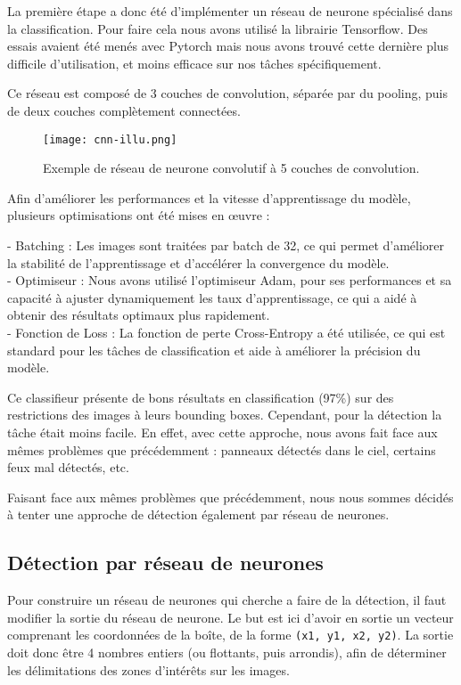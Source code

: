 \documentclass[twocolumn,10pt]{article}
\begin{document}
    La première étape a donc été d'implémenter un réseau de neurone spécialisé dans la classification. Pour faire cela nous avons utilisé la librairie Tensorflow. Des essais avaient été menés avec Pytorch mais nous avons trouvé cette dernière plus difficile d'utilisation, et moins efficace sur nos tâches spécifiquement.

    Ce réseau est composé de 3 couches de convolution, séparée par du pooling, puis de deux couches complètement connectées.

    \begin{figure}[H]
        \centering
        \texttt{[image: cnn-illu.png]}
        \caption{Exemple de réseau de neurone convolutif à 5 couches de convolution.}
        \label{fig:cnn}
    \end{figure}

    Afin d'améliorer les performances et la vitesse d'apprentissage du modèle, plusieurs optimisations ont été mises en œuvre :

    - Batching : Les images sont traitées par batch de 32, ce qui permet d'améliorer la stabilité de l'apprentissage et d'accélérer la convergence du modèle.\\
    - Optimiseur : Nous avons utilisé l'optimiseur Adam, pour ses performances et sa capacité à ajuster dynamiquement les taux d'apprentissage, ce qui a aidé à obtenir des résultats optimaux plus rapidement.\\
    - Fonction de Loss : La fonction de perte Cross-Entropy a été utilisée, ce qui est standard pour les tâches de classification et aide à améliorer la précision du modèle.

    Ce classifieur présente de bons résultats en classification (97\%) sur des restrictions des images à leurs bounding boxes. Cependant, pour la détection la tâche était moins facile. En effet, avec cette approche, nous avons fait face aux mêmes problèmes que précédemment : panneaux détectés dans le ciel, certains feux mal détectés, etc.

    Faisant face aux mêmes problèmes que précédemment, nous nous sommes décidés à tenter une approche de détection également par réseau de neurones.

    \subsection{Détection par réseau de neurones}

    Pour construire un réseau de neurones qui cherche a faire de la détection, il faut modifier la sortie du réseau de neurone. Le but est ici d'avoir en sortie un vecteur comprenant les coordonnées de la boîte, de la forme \texttt{(x1, y1, x2, y2)}. La sortie doit donc être 4 nombres entiers (ou flottants, puis arrondis), afin de déterminer les délimitations des zones d'intérêts sur les images.
\end{document}
